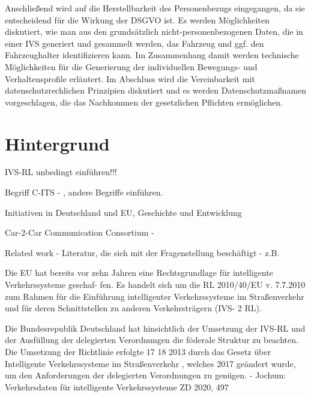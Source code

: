 Anschließend wird auf die Herstellbarkeit des Personenbezugs eingegangen, da sie entscheidend für die Wirkung der DSGVO ist. Es werden Möglichkeiten diskutiert, wie man aus den grundsätzlich nicht-personenbezogenen Daten, die in einer IVS generiert und gesammelt werden, das Fahrzeug und ggf. den Fahrzeughalter identifizieren kann. Im Zusammenhang damit werden technische Möglichkeiten für die Generierung der individuellen Bewegungs- und Verhaltensprofile erläutert. Im Abschluss wird die Vereinbarkeit mit datenschutzrechlichen Prinzipien diskutiert und es werden Datenschutzmaßnamen vorgeschlagen, die das Nachkommen der gesetzlichen Pflichten ermöglichen.


\section{Hintergrund}
\label{ch:Citation}

IVS-RL unbedingt einführen!!!

Begriff C-ITS - \cite{CITS2016}, andere Begriffe einführen.

Initiativen in Deutschland und EU, Geschichte und Entwicklung

Car-2-Car Communication Consortium - \cite{Car2Car}

Related work - Literatur, die sich mit der Fragenstellung beschäftigt - z.B. \cite{Jochum2020}

Die EU hat bereits vor zehn Jahren eine Rechtsgrundlage für intelligente Verkehrssysteme geschaf- fen. Es handelt sich um die RL 2010/40/EU v. 7.7.2010 zum Rahmen für die Einführung intelligenter Verkehrssysteme im Straßenverkehr und für deren Schnittstellen zu anderen Verkehrsträgern (IVS-
2
RL). 

Die Bundesrepublik Deutschland hat hinsichtlich der Umsetzung der IVS-RL und der Ausfüllung der delegierten Verordnungen die föderale Struktur zu beachten. Die Umsetzung der Richtlinie erfolgte
17 18
2013 durch das Gesetz über Intelligente Verkehrssysteme im Straßenverkehr , welches 2017 geändert wurde, um den Anforderungen der delegierten Verordnungen zu genügen.
- Jochum: Verkehrsdaten für intelligente Verkehrssysteme ZD 2020, 497




